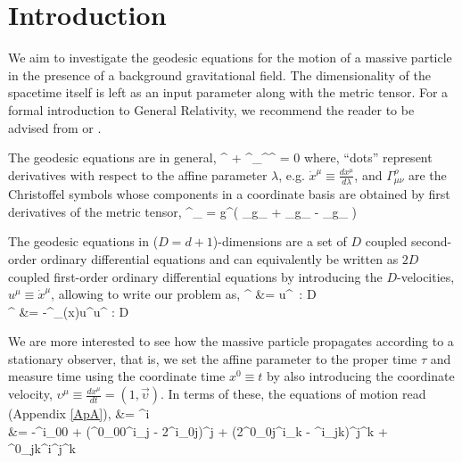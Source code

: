 \section{Introduction}
\label{Sec1}

We aim to investigate the geodesic equations for the motion of a massive particle in the presence of a background gravitational field. The dimensionality of the spacetime itself is left as an input parameter along with the metric tensor. For a formal introduction to General Relativity, we recommend the reader to be advised from \cite{WeinbergGR} or \cite{GR_Carroll}.

The geodesic equations are in general,
\be
	^{\rho} + \Gamma^{\rho}_{\mu\nu}^{\mu}^{\nu} = 0
\ee
where, ``dots'' represent derivatives with respect to the affine parameter $\lambda$, e.g. $\dot{x}^{\mu} \equiv \frac{dx^{\mu}}{d\lambda}$, and $\Gamma^{\rho}_{\mu\nu}$ are the Christoffel symbols whose components in a coordinate basis are obtained by first derivatives of the metric tensor,
\be\label{Christoffel}
	\Gamma^{\rho}_{\mu\nu} = g^{\rho\sigma}\left( \partial_{\mu}g_{\sigma\nu} + \partial_{\nu}g_{\mu\sigma} - \partial_{\sigma}g_{\mu\nu} \right)
\ee

The geodesic equations in ($D=d+1$)-dimensions are a set of $D$ coupled second-order ordinary differential equations and can equivalently be written as $2D$ coupled first-order ordinary differential equations by introducing the $D$-velocities, $u^{\mu} \equiv \dot{x}^{\mu}$, allowing to write our problem as,
\be\ba
	^{\rho} &= u^{\rho} \;\;\;\;\;\;\;\;\;\;\;\;\;\;\;\;\;\;\,:\;\; D \\
	^{\rho} &= -\Gamma^{\rho}_{\mu\nu}(x)u^{\mu}u^{\nu} \;\;:\;\; D
\ea\ee

We are more interested to see how the massive particle propagates according to a stationary observer, that is, we set the affine parameter to the proper time $\tau$ and measure time using the coordinate time $x^0\equiv t$ by also introducing the coordinate velocity, $\upsilon^{\mu} \equiv \frac{dx^{\mu}}{dt} = (1,\vec{\upsilon})$. In terms of these, the equations of motion read (Appendix \ref{ApA}),
\be\ba\label{EOM}
	 &= \upsilon^{i} \\
	 &= -\Gamma^{i}_{00} + \left(\Gamma^{0}_{00}\delta^{i}_{j} - 2\Gamma^{i}_{0j}\right)\upsilon^{j} + \left(2\Gamma^{0}_{0j}\delta^{i}_{k} - \Gamma^{i}_{jk}\right)\upsilon^{j}\upsilon^{k} + \Gamma^{0}_{jk}\upsilon^{i}\upsilon^{j}\upsilon^{k}
\ea\ee

